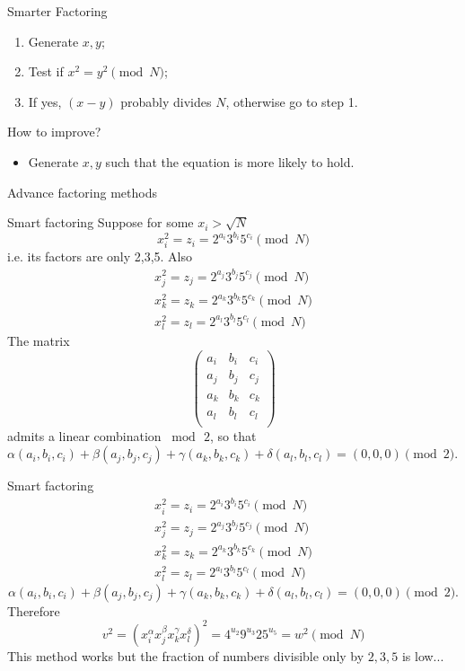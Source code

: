 \documentclass[t]{beamer}
\begin{document}
\begin{frame}{Smarter Factoring}
\begin{enumerate}
    \item Generate $x,y$;
    \item Test if $x^2 = y^2 \pmod{N}$;
    \item If yes, $(x-y)$ probably divides $N$, otherwise go to step 1.
    
\end{enumerate}
How to improve?
\begin{itemize}
    \item Generate $x,y$ such that the equation is more likely to hold. 
\end{itemize}

\end{frame}

\begin{frame}[c]
\begin{center}
    \Large{Advance factoring methods}
    \end{center}
\end{frame}

\begin{frame}{Smart factoring}
Suppose for some $x_i >\sqrt{N}$ 
$$
x_i^2 =z_i =  2^{a_i}3^{b_i}5^{c_i} \pmod{N}
$$
 i.e. its factors are only 2,3,5.
Also
\begin{align*}
x_j^2 =z_j =  2^{a_j}3^{b_j}5^{c_j} \pmod{N}\\
x_k^2 =z_k =  2^{a_k}3^{b_k}5^{c_k} \pmod{N}\\
x_l^2 =z_l =  2^{a_l}3^{b_l}5^{c_l} \pmod{N}\end{align*}
The matrix 
$$
\begin{pmatrix}
a_i & b_i & c_i\\
a_j & b_j & c_j\\
a_k & b_k & c_k\\
a_l & b_l & c_l\\
\end{pmatrix}
$$
admits a linear combination $\bmod{\,2}$, so that
$\alpha(a_i,b_i,c_i) + \beta(a_j,b_j,c_j)+\gamma (a_k,b_k,c_k) + \delta(a_l,b_l,c_l)=(0,0,0) \pmod{2}$.

\end{frame}


\begin{frame}{Smart factoring}
\begin{align*}x_i^2 =z_i =  2^{a_i}3^{b_i}5^{c_i} \pmod{N}\\
x_j^2 =z_j =  2^{a_j}3^{b_j}5^{c_j} \pmod{N}\\
x_k^2 =z_k =  2^{a_k}3^{b_k}5^{c_k} \pmod{N}\\
x_l^2 =z_l =  2^{a_l}3^{b_l}5^{c_l} \pmod{N}\end{align*}
$$
\alpha(a_i,b_i,c_i) + \beta(a_j,b_j,c_j)+\gamma (a_k,b_k,c_k) + \delta(a_l,b_l,c_l)=(0,0,0) \pmod{2}.
$$
Therefore 
$$
v^2 = (x_i^{\alpha}x_j^{\beta}x_k^{\gamma}x_l^{\delta})^2 = 
4^{u_2}9^{u_3}25^{u_5} = w^2 \pmod{N}
$$
\pause This method works but the fraction of numbers divisible only by $2,3,5$ is low...

\end{frame}
\end{document}
